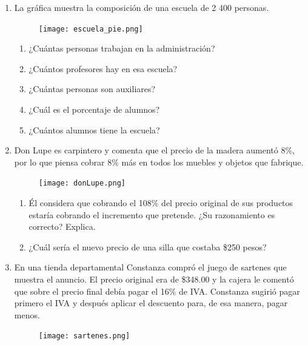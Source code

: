 \documentclass[11pt]{book}
\begin{document}
\begin{enumerate}
  \item La gráfica muestra la composición de una escuela de 2 400 personas.
        \begin{figure}[H]
          \centering
          \texttt{[image: escuela\_pie.png]}
          \label{fig:escuela_pie}
        \end{figure}
        \begin{enumerate}
          \item ¿Cuántas personas trabajan en la administración?
          \item ¿Cuántos profesores hay en esa escuela?
          \item ¿Cuántas personas son auxiliares?
          \item ¿Cuál es el porcentaje de alumnos?
          \item ¿Cuántos alumnos tiene la escuela?
        \end{enumerate}
  \item Don Lupe es carpintero y comenta que el precio de la madera aumentó 8\%, por lo
        que piensa cobrar 8\% más en todos los muebles y objetos que fabrique.
        \begin{figure}[H]
          \centering
          \texttt{[image: donLupe.png]}
          \label{fig:donLupe}
        \end{figure}
        \begin{enumerate}
          \item Él considera que cobrando el 108\% del precio original de sus productos
                estaría cobrando el incremento que pretende. ¿Su razonamiento es correcto? Explica.
          \item ¿Cuál sería el nuevo precio de una silla que costaba \$250 pesos?
        \end{enumerate}
  \item En una tienda departamental Constanza compró el juego de sartenes que muestra
        el anuncio. El precio original era de \$348.00 y la cajera le comentó que sobre el
        precio final debía pagar el 16\% de IVA. Constanza sugirió pagar primero el IVA y
        después aplicar el descuento para, de esa manera, pagar menos.
        \begin{figure}[H]
          \centering
          \texttt{[image: sartenes.png]}
          \label{fig:sartenes}
        \end{figure}

\end{enumerate}
\end{document}
